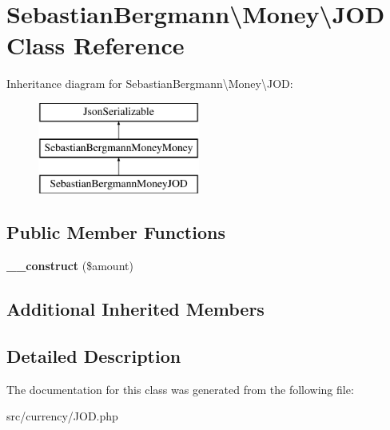 \hypertarget{classSebastianBergmann_1_1Money_1_1JOD}{}\section{Sebastian\+Bergmann\textbackslash{}Money\textbackslash{}J\+O\+D Class Reference}
\label{classSebastianBergmann_1_1Money_1_1JOD}
Inheritance diagram for Sebastian\+Bergmann\textbackslash{}Money\textbackslash{}J\+O\+D\+:\begin{figure}[H]
\begin{center}
\leavevmode
\includegraphics[height=3.000000cm]{classSebastianBergmann_1_1Money_1_1JOD}
\end{center}
\end{figure}
\subsection*{Public Member Functions}
\begin{DoxyCompactItemize}
\item 
\hypertarget{classSebastianBergmann_1_1Money_1_1JOD_ab41da9ff01d4b9612c19f60835fb5763}{}{\bfseries \+\_\+\+\_\+construct} (\$amount)\label{classSebastianBergmann_1_1Money_1_1JOD_ab41da9ff01d4b9612c19f60835fb5763}

\end{DoxyCompactItemize}
\subsection*{Additional Inherited Members}


\subsection{Detailed Description}


The documentation for this class was generated from the following file\+:\begin{DoxyCompactItemize}
\item 
src/currency/J\+O\+D.\+php\end{DoxyCompactItemize}
